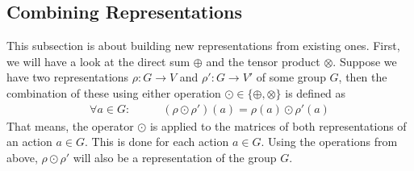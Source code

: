 \subsection{Combining Representations}

This subsection is about building new representations from existing ones.
First, we will have a look at the direct sum $\oplus$ and the tensor product $\otimes$.
Suppose we have two representations $\rho: G \to V$ and $\rho': G \to V'$ of some group $G$, then the combination of these using either operation $\odot \in \{\oplus, \otimes\}$ is defined as
\begin{align*}
    \forall a \in G: \qquad & (\rho \odot \rho')(a) = \rho(a) \odot \rho'(a)
\end{align*}
That means, the operator $\odot$ is applied to the matrices of both representations of an action $a \in G$.
This is done for each action $a \in G$.
Using the operations from above, $\rho \odot \rho'$ will also be a representation of the group $G$.
